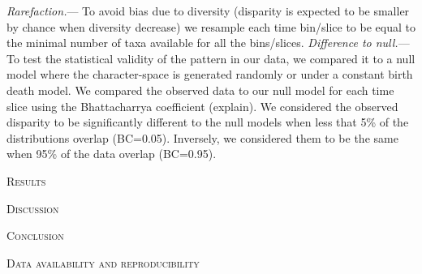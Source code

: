 \documentclass[12pt,letterpaper]{article}
\renewcommand{\section}[1]{%
\bigskip
\begin{center}
\begin{Large}
\normalfont\scshape #1
\medskip
\end{Large}
\end{center}}
\renewcommand{\subsubsection}[1]{%
\vspace{2ex}
\noindent
\textit{#1.}---}
\begin{document}
\subsubsection{Rarefaction}
To avoid bias due to diversity (disparity is expected to be smaller by chance when diversity decrease) we resample each time bin/slice to be equal to the minimal number of taxa available for all the bins/slices.
\subsubsection{Difference to null}
To test the statistical validity of the pattern in our data, we compared it to a null model where the character-space is generated randomly or under a constant birth death model. We compared the observed data to our null model for each time slice using the Bhattacharrya  coefficient (explain). We considered the observed disparity to be significantly different to the null models when less that 5\% of the distributions overlap (BC=0.05). Inversely, we considered them to be the same when 95\% of the data overlap (BC=0.95).

%
%

\section{Results}

%
%

\section{Discussion}
%
%

\section{Conclusion}



\section{Data availability and reproducibility}
\end{document}

